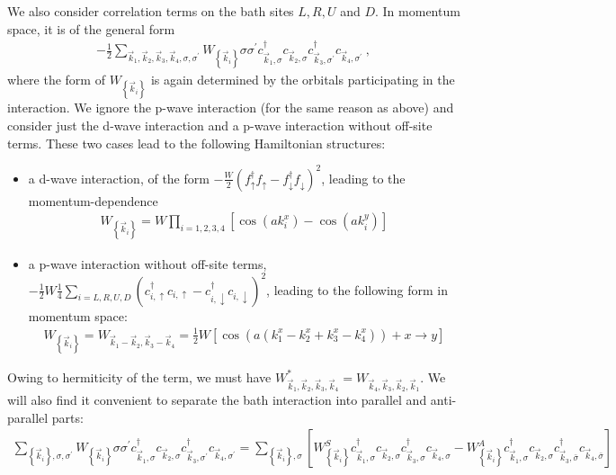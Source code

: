 \documentclass{revtex4-2}
\begin{document}
We also consider correlation terms on the bath sites \(L,R,U\) and \(D\). In momentum space, it is of the general form
\begin{equation}\begin{aligned}
	-\frac{1}{2}\sum_{\vec k_1,\vec k_2, \vec k_3, \vec k_4,\sigma,\sigma^\prime}W_{\left\{\vec k_i\right\}} \sigma\sigma^\prime c^\dagger_{\vec k_1,\sigma}c_{\vec k_2,\sigma}c^\dagger_{\vec k_3,\sigma^\prime}c_{\vec k_4,\sigma^\prime}~,
\end{aligned}\end{equation}
where the form of \(W_{\left\{\vec k_i\right\}}\) is again determined by the orbitals participating in the interaction. We ignore the p-wave interaction (for the same reason as above) and consider just the d-wave interaction and a p-wave interaction without off-site terms. These two cases lead to the following Hamiltonian structures:
\begin{itemize}
	\item a d-wave interaction, of the form \(-\frac{W}{2}\left(f^\dagger_{\uparrow}f_{\uparrow} - f^\dagger_{\downarrow}f_{\downarrow}\right)^2\), leading to the momentum-dependence
\begin{equation}\begin{aligned}\label{W_dwave}
	W_{\left\{\vec k_i\right\}} = W\prod_{i=1,2,3,4}\left[\cos\left( ak_i^x \right) - \cos\left( ak_i^y \right) \right]
\end{aligned}\end{equation}
	\item a p-wave interaction without off-site terms, \(-\frac{1}{2}W\frac{1}{4}\sum_{i=L,R,U,D}\left(c^\dagger_{i,\uparrow}c_{i,\uparrow} - c^\dagger_{i,\downarrow}c_{i,\downarrow}\right)^2\), leading to the following form in momentum space:
\begin{equation}\begin{aligned}\label{W_pwave_nooffsite}
	W_{\left\{\vec k_i\right\}} = W_{\vec k_1 - \vec k_2, \vec k_3 - \vec k_4} = \frac{1}{2}W\left[\cos\left(a\left(k_1^x - k_2^x + k_3^x - k_4^x\right)\right) + x \to y\right]
\end{aligned}\end{equation}
\end{itemize}
Owing to hermiticity of the term, we must have \(W^*_{\vec k_1,\vec k_2,\vec k_3,\vec k_4} = W_{\vec k_4,\vec k_3,\vec k_2,\vec k_1}\). We will also find it convenient to separate the bath interaction into parallel and anti-parallel parts:
\begin{equation}\begin{aligned}
	\sum_{\left\{ \vec k_i \right\} ,\sigma,\sigma^\prime}W_{\left\{\vec k_i\right\}} \sigma\sigma^\prime c^\dagger_{\vec k_1,\sigma}c_{\vec k_2,\sigma}c^\dagger_{\vec k_3,\sigma^\prime}c_{\vec k_4,\sigma^\prime} = \sum_{\left\{ \vec k_i \right\},\sigma}\left[W^S_{\left\{\vec k_i\right\}} c^\dagger_{\vec k_1,\sigma}c_{\vec k_2,\sigma}c^\dagger_{\vec k_3,\sigma}c_{\vec k_4,\sigma} - W^A_{\left\{\vec k_i\right\}} c^\dagger_{\vec k_1,\sigma}c_{\vec k_2,\sigma}c^\dagger_{\vec k_3,\bar\sigma}c_{\vec k_4,\bar\sigma}\right]
\end{aligned}\end{equation}
\end{document}
